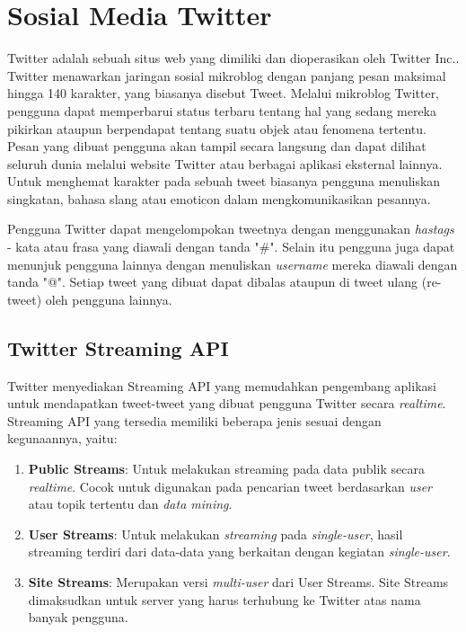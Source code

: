 \section{Sosial Media Twitter}
\label{sec:twitter}
Twitter adalah sebuah situs web yang dimiliki dan dioperasikan oleh Twitter Inc.. Twitter menawarkan jaringan sosial mikroblog dengan panjang pesan maksimal hingga 140 karakter, yang biasanya disebut Tweet. Melalui mikroblog Twitter, pengguna dapat memperbarui status terbaru tentang hal yang sedang mereka pikirkan ataupun berpendapat tentang suatu objek atau fenomena tertentu. Pesan yang dibuat pengguna akan tampil secara langsung dan dapat dilihat seluruh dunia melalui website Twitter atau berbagai aplikasi eksternal lainnya. Untuk menghemat karakter pada sebuah tweet biasanya pengguna menuliskan singkatan, bahasa slang atau emoticon dalam mengkomunikasikan pesannya. 

Pengguna Twitter dapat mengelompokan tweetnya dengan menggunakan \textit{hastags} - kata atau frasa yang diawali dengan tanda "\#". Selain itu pengguna juga dapat menunjuk pengguna lainnya dengan menuliskan \textit{username} mereka diawali dengan tanda "@". Setiap tweet yang dibuat dapat dibalas ataupun di tweet ulang (re-tweet) oleh pengguna lainnya.

\subsection{Twitter Streaming API}
\label{sec:twitter_streaming_api}
Twitter menyediakan Streaming API yang memudahkan pengembang aplikasi untuk mendapatkan tweet-tweet yang dibuat pengguna Twitter secara \textit{realtime}. Streaming API yang tersedia memiliki beberapa jenis sesuai dengan kegunaannya, yaitu:

\begin{enumerate}
	\item \textbf{Public Streams}: Untuk melakukan streaming pada data publik secara \textit{realtime}. Cocok untuk digunakan pada pencarian tweet berdasarkan \textit{user} atau topik tertentu dan \textit{data mining}.
	\item \textbf{User Streams}: Untuk melakukan \textit{streaming} pada \textit{single-user}, hasil streaming terdiri dari data-data yang berkaitan dengan kegiatan \textit{single-user}.
	\item	\textbf{Site Streams}: Merupakan versi \textit{multi-user} dari User Streams. Site Streams dimaksudkan untuk server yang harus terhubung ke Twitter atas nama banyak pengguna.
\end{enumerate}

